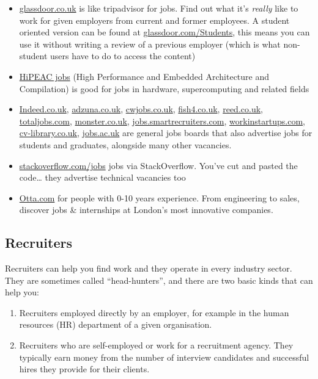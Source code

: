 \documentclass[
]{book}
\providecommand{\tightlist}{%
  \setlength{\itemsep}{0pt}\setlength{\parskip}{0pt}}
\begin{document}
\begin{itemize}
\tightlist
\item
  \href{http://www.glassdoor.co.uk/}{glassdoor.co.uk} is like tripadvisor for jobs. Find out what it's \emph{really} like to work for given employers from current and former employees. A student oriented version can be found at \href{https://www.glassdoor.com/Students}{glassdoor.com/Students}, this means you can use it without writing a review of a previous employer (which is what non-student users have to do to access the content)
\item
  \href{https://www.hipeac.net/jobs}{HiPEAC jobs} (High Performance and Embedded Architecture and Compilation) is good for jobs in hardware, supercomputing and related fields
\item
  \href{http://www.indeed.co.uk}{Indeed.co.uk}, \href{https://www.adzuna.co.uk}{adzuna.co.uk}, \href{https://www.cwjobs.co.uk/}{cwjobs.co.uk}, \href{https://www.fish4.co.uk}{fish4.co.uk}, \href{https://www.reed.co.uk/}{reed.co.uk}, \href{https://www.totaljobs.com}{totaljobs.com}, \href{https://www.monster.co.uk}{monster.co.uk}, \href{https://jobs.smartrecruiters.com}{jobs.smartrecruiters.com}, \href{https://workinstartups.com}{workinstartups.com}, \href{https://www.cv-library.co.uk}{cv-library.co.uk}, \href{https://www.jobs.ac.uk}{jobs.ac.uk} are general jobs boards that also advertise jobs for students and graduates, alongside many other vacancies.
\item
  \href{http://stackoverflow.com/jobs}{stackoverflow.com/jobs} jobs via StackOverflow. You've cut and pasted the code\ldots{} they advertise technical vacancies too
\item
  \href{https://otta.com/}{Otta.com} for people with 0-10 years experience. From engineering to sales, discover jobs \& internships at London's most innovative companies.
\end{itemize}

\hypertarget{recruiters}{%
\subsection{Recruiters}\label{recruiters}}

Recruiters can help you find work and they operate in every industry sector. They are sometimes called ``head-hunters'', and there are two basic kinds that can help you:

\begin{enumerate}
\def\labelenumi{\arabic{enumi}.}
\tightlist
\item
  Recruiters employed directly by an employer, for example in the human resources (HR) department of a given organisation.
\item
  Recruiters who are self-employed or work for a recruitment agency. They typically earn money from the number of interview candidates and successful hires they provide for their clients.
\end{enumerate}
\end{document}
